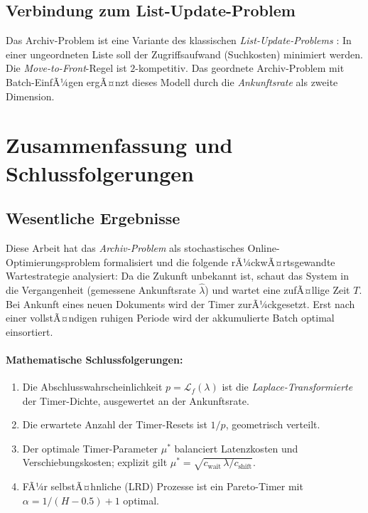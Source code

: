 ﻿\documentclass[12pt, a4paper]{article}
\begin{document}
\subsection{Verbindung zum List-Update-Problem}

Das Archiv-Problem ist eine Variante des klassischen \emph{List-Update-Problems}
\cite{sleator1985amortized}: In einer ungeordneten Liste soll der
Zugriffsaufwand (Suchkosten) minimiert werden. Die \emph{Move-to-Front}-Regel
ist $2$-kompetitiv. Das geordnete Archiv-Problem mit Batch-EinfÃ¼gen ergÃ¤nzt
dieses Modell durch die \emph{Ankunftsrate} als zweite Dimension.

\section{Zusammenfassung und Schlussfolgerungen}\label{sec:conclusion}

\subsection{Wesentliche Ergebnisse}

Diese Arbeit hat das \emph{Archiv-Problem} als stochastisches Online-Optimierungsproblem
formalisiert und die folgende rÃ¼ckwÃ¤rtsgewandte Wartestrategie analysiert: Da die
Zukunft unbekannt ist, schaut das System in die Vergangenheit (gemessene
Ankunftsrate $\hat\lambda$) und wartet eine zufÃ¤llige Zeit $T$. Bei Ankunft
eines neuen Dokuments wird der Timer zurÃ¼ckgesetzt. Erst nach einer vollstÃ¤ndigen
ruhigen Periode wird der akkumulierte Batch optimal einsortiert.

\paragraph{Mathematische Schlussfolgerungen:}
\begin{enumerate}[label=\arabic*.,noitemsep]
  \item Die Abschlusswahrscheinlichkeit $p = \mathcal{L}_f(\lambda)$ ist die
        \emph{Laplace-Transformierte} der Timer-Dichte, ausgewertet an der
        Ankunftsrate.
  \item Die erwartete Anzahl der Timer-Resets ist $1/p$, geometrisch verteilt.
  \item Der optimale Timer-Parameter $\mu^*$ balanciert Latenzkosten und
        Verschiebungskosten; explizit gilt
        $\mu^* = \sqrt{c_{\mathrm{wait}}\,\lambda/c_{\mathrm{shift}}}$.
  \item FÃ¼r selbstÃ¤hnliche (LRD) Prozesse ist ein Pareto-Timer mit
        $\alpha = 1/(H-0.5) + 1$ optimal.
\end{enumerate}
\end{document}
